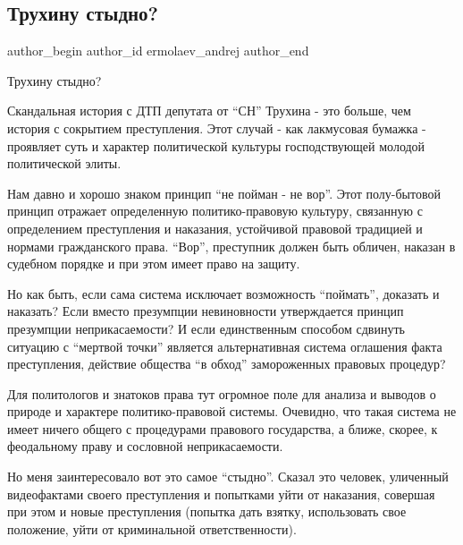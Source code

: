  
 
 
 
 
 
\subsection{Трухину стыдно?}
\label{sec:03_02_2022.fb.ermolaev_andrej.1.truhinu_stydno}
 
\ifcmt
 author_begin
   author_id ermolaev_andrej
 author_end
\fi

Трухину стыдно?

Скандальная история с ДТП депутата от \enquote{СН} Трухина - это больше, чем история с
сокрытием преступления. Этот случай - как лакмусовая бумажка - проявляет суть и
характер политической культуры господствующей молодой политической элиты.

Нам давно и хорошо знаком принцип \enquote{не пойман - не вор}. Этот полу-бытовой
принцип отражает определенную политико-правовую культуру, связанную с
определением преступления и наказания, устойчивой правовой традицией и нормами
гражданского права. \enquote{Вор}, преступник должен быть обличен, наказан в судебном
порядке и при этом имеет право на защиту. 

Но как быть, если сама система исключает возможность \enquote{поймать}, доказать и
наказать? Если вместо презумпции невиновности утверждается принцип презумпции
неприкасаемости? И если единственным способом сдвинуть ситуацию с \enquote{мертвой
точки} является альтернативная система оглашения факта преступления, действие
общества \enquote{в обход} замороженных правовых процедур?

Для политологов и знатоков права тут огромное поле для анализа и выводов о
природе и характере политико-правовой системы. Очевидно, что такая система не
имеет ничего общего с процедурами правового государства, а ближе, скорее, к
феодальному праву и сословной неприкасаемости.

Но меня заинтересовало вот это самое \enquote{стыдно}. Сказал это человек, уличенный
видеофактами своего преступления и попытками уйти от наказания, совершая при
этом и новые преступления (попытка дать взятку, использовать свое положение,
уйти от криминальной ответственности).

